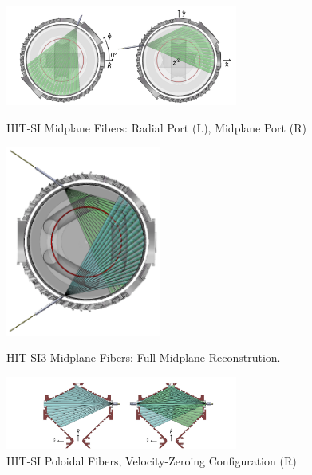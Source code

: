 \documentclass{AIAA}
\begin{document}
\begin{center}
\begin{figure}
\includegraphics[width=3in]{HITSI_Midplane.jpg}
\caption{HIT-SI Midplane Fibers: Radial Port (L), Midplane Port (R)}\label{HIT-SI Fibers Midplane}
\includegraphics[width=2in]{Mohawk_IDS_dual.png}
\caption{HIT-SI3 Midplane Fibers: Full Midplane Reconstrution.}\label{HIT-SI3 Fibers Midplane}
\includegraphics[width=3in]{Untitled.jpg}
\caption{HIT-SI Poloidal Fibers, Velocity-Zeroing Configuration (R)}\label{Fibers Poloidal}
\end{figure}
\end{center}
\end{document}
